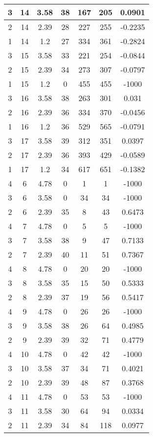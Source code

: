 \documentclass[letterpaper, 12pt]{article}
\begin{document}
\begin{longtable}{|c|c|c|c|c|c|c|}
\hline
3 & 14 & 3.58 & 38 & 167 & 205 & 0.0901 \\
\hline
2 & 14 & 2.39 & 28 & 227 & 255 & -0.2235 \\
\hline
1 & 14 & 1.2 & 27 & 334 & 361 & -0.2824 \\
\hline
3 & 15 & 3.58 & 33 & 221 & 254 & -0.0844 \\
\hline
2 & 15 & 2.39 & 34 & 273 & 307 & -0.0797 \\
\hline
1 & 15 & 1.2 & 0 & 455 & 455 & -1000 \\
\hline
3 & 16 & 3.58 & 38 & 263 & 301 & 0.031 \\
\hline
2 & 16 & 2.39 & 36 & 334 & 370 & -0.0456 \\
\hline
1 & 16 & 1.2 & 36 & 529 & 565 & -0.0791 \\
\hline
3 & 17 & 3.58 & 39 & 312 & 351 & 0.0397 \\
\hline
2 & 17 & 2.39 & 36 & 393 & 429 & -0.0589 \\
\hline
1 & 17 & 1.2 & 34 & 617 & 651 & -0.1382 \\
\hline
4 & 6 & 4.78 & 0 & 1 & 1 & -1000 \\
\hline
3 & 6 & 3.58 & 0 & 34 & 34 & -1000 \\
\hline
2 & 6 & 2.39 & 35 & 8 & 43 & 0.6473 \\
\hline
4 & 7 & 4.78 & 0 & 5 & 5 & -1000 \\
\hline
3 & 7 & 3.58 & 38 & 9 & 47 & 0.7133 \\
\hline
2 & 7 & 2.39 & 40 & 11 & 51 & 0.7367 \\
\hline
4 & 8 & 4.78 & 0 & 20 & 20 & -1000 \\
\hline
3 & 8 & 3.58 & 35 & 15 & 50 & 0.5333 \\
\hline
2 & 8 & 2.39 & 37 & 19 & 56 & 0.5417 \\
\hline
4 & 9 & 4.78 & 0 & 26 & 26 & -1000 \\
\hline
3 & 9 & 3.58 & 38 & 26 & 64 & 0.4985 \\
\hline
2 & 9 & 2.39 & 39 & 32 & 71 & 0.4779 \\
\hline
4 & 10 & 4.78 & 0 & 42 & 42 & -1000 \\
\hline
3 & 10 & 3.58 & 37 & 34 & 71 & 0.4021 \\
\hline
2 & 10 & 2.39 & 39 & 48 & 87 & 0.3768 \\
\hline
4 & 11 & 4.78 & 0 & 53 & 53 & -1000 \\
\hline
3 & 11 & 3.58 & 30 & 64 & 94 & 0.0334 \\
\hline
2 & 11 & 2.39 & 34 & 84 & 118 & 0.0977 \\

\end{longtable}
\end{document}
